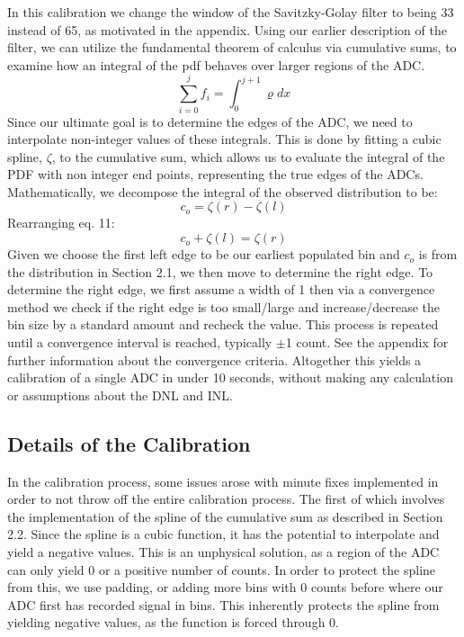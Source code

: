 \documentclass[11pt, letterpaper]{article}
\begin{document}
In this calibration we change the window of the Savitzky-Golay filter to being 33 instead of 65, as motivated in the appendix. 
Using our earlier description of the filter, we can utilize the fundamental theorem of calculus via cumulative sums, to examine how an integral of the pdf behaves over larger regions of the ADC. 
 \begin{equation}\label{}
\sum_{i=0}^{j} f_i= \int_{0}^{j+1} \varrho dx
\end{equation}
Since our ultimate goal is to determine the edges of the ADC, we need to interpolate non-integer values of these integrals. 
This is done by fitting a cubic spline, $ \zeta$, to the cumulative sum, which allows us to evaluate the integral of the PDF with non integer end points, representing the true edges of the ADCs. 
Mathematically, we decompose the integral of the observed distribution to be:
 \begin{equation}\label{}
c_o = \zeta(r) - \zeta(l)
\end{equation}
Rearranging eq. 11: 
 \begin{equation}\label{}
c_o + \zeta(l) = \zeta(r)
\end{equation}
Given we choose the first left edge to be our earliest populated bin and $c_{o}$ is from the distribution in Section 2.1, we then move to determine the right edge. 
To determine the right edge, we first assume a width of 1 then via a convergence method we check if the right edge is too small/large and increase/decrease the bin size by a standard amount and recheck the value. 
This process is repeated until a convergence interval is reached, typically $\pm$1 count. 
See the appendix for further information about the convergence criteria. 
Altogether this yields a calibration of a single ADC in under 10 seconds, without making any calculation or assumptions about the DNL and INL.
\subsection{Details of the Calibration} 
\indent 


In the calibration process, some issues arose with minute fixes implemented in order to not throw off the entire calibration process. 
The first of which involves the implementation of the spline of the cumulative sum as described in Section 2.2. 
Since the spline is a cubic function, it has the potential to interpolate and yield a negative values. 
This is an unphysical solution, as a region of the ADC can only yield 0 or a positive number of counts. 
In order to protect the spline from this, we use padding, or adding more bins with 0 counts before where our ADC first has recorded signal in bins. 
This inherently protects the spline from yielding negative values, as the function is forced through 0. 
\indent 
\end{document}
